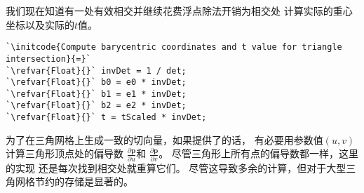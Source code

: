 我们现在知道有一处有效相交并继续花费浮点除法开销为相交处
计算实际的重心坐标以及实际的$t$值。
\begin{lstlisting}
`\initcode{Compute barycentric coordinates and t value for triangle intersection}{=}`
`\refvar{Float}{}` invDet = 1 / det;
`\refvar{Float}{}` b0 = e0 * invDet;
`\refvar{Float}{}` b1 = e1 * invDet;
`\refvar{Float}{}` b2 = e2 * invDet;
`\refvar{Float}{}` t = tScaled * invDet;
\end{lstlisting}

为了在三角网格上生成一致的切向量，如果提供了的话，
有必要用参数值$(u,v)$计算三角形顶点处的偏导数
$\displaystyle\frac{\partial \bm p}{\partial u}$和
$\displaystyle\frac{\partial \bm p}{\partial v}$。
尽管三角形上所有点的偏导数都一样，这里的实现
还是每次找到相交处就重算它们。
尽管这导致多余的计算，但对于大型三角网格节约的存储是显著的。

